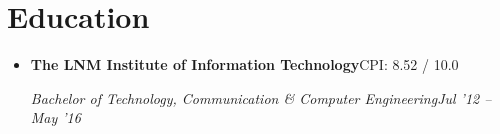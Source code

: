 \documentclass[letterpaper,11pt]{article}
\newlength{\textlead}   \setlength{\textlead}{12.5pt} %
\let\origsmall\small
\renewcommand\small{\origsmall\setlength{\baselineskip}{\textlead}}
\newenvironment{resume}{\vspace*{\fill}\nointerlineskip}{\vspace*{\fill}}
\newcommand{\resumeSubheading}[4]{
  \item \textbf{#1}\hfill #2\par
  {\small\textit{#3}\hfill\textit{#4}\par}
}
\newcommand{\resumeSubHeadingListStart}{\begin{itemize}}
\newcommand{\resumeSubHeadingListEnd}{\end{itemize}}
\newcommand{\resumeLineListStart}{\begin{itemize}[before=\small]}
\newcommand{\resumeLineListEnd}{\end{itemize}}
\begin{document}
\begin{resume}


\section{Education}
  \resumeSubHeadingListStart
    \resumeSubheading
      {The LNM Institute of Information Technology}{CPI: 8.52 / 10.0}
      {Bachelor of Technology, Communication \& Computer Engineering}{Jul '12 -- May '16}
  \resumeSubHeadingListEnd


\end{resume}
\end{document}
